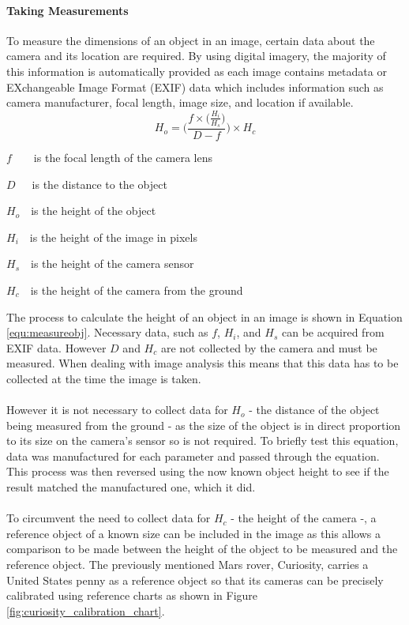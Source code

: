 	\paragraph{Taking Measurements}\label{sec:taking_measurements}
		To measure the dimensions of an object in an image, certain data about the camera and its location are required. By using digital imagery, the majority of this information is automatically provided as each image contains metadata or EXchangeable Image Format (EXIF) data which includes information such as camera manufacturer, focal length, image size, and location if available.
	\begin{equation}
		\label{equ:measureobj}
		H_{o} = \Bigg(\frac{f\times\big(\frac{H_{i}}{H_{s}}\big)}{D - f}\Bigg)\times H_{c}
	\end{equation}
	\begin{where}
		\item $f$~~~~is the focal length of the camera lens
		\item $D$~~~is the distance to the object
		\item $H_{o}$~~is the height of the object
		\item $H_{i}$~~is the height of the image in pixels
		\item $H_{s}$~~is the height of the camera sensor
		\item $H_{c}$~~is the height of the camera from the ground
	\end{where}
	\vspace{5mm}
	The process to calculate the height of an object in an image is shown in Equation \ref{equ:measureobj}. Necessary data, such as $f$, $H_i$, and $H_s$ can be acquired from EXIF data. However $D$ and $H_c$ are not collected by the camera and must be measured. When dealing with image analysis this means that this data has to be collected at the time the image is taken.
	\\\\
	However it is not necessary to collect data for $H_o$ - the distance of the object being measured from the ground - as the size of the object is in direct proportion to its size on the camera’s sensor so is not required. To briefly test this equation, data was manufactured for each parameter and passed through the equation. This process was then reversed using the now known object height to see if the result matched the manufactured one, which it did.
	\\\\
	To circumvent the need to collect data for $H_c$ - the height of the camera -, a reference object of a known size can be included in the image as this allows a comparison to be made between the height of the object to be measured and the reference object. The previously mentioned Mars rover, Curiosity, carries a United States penny as a reference object so that its cameras can be precisely calibrated using reference charts as shown in Figure \ref{fig:curiosity_calibration_chart}.
